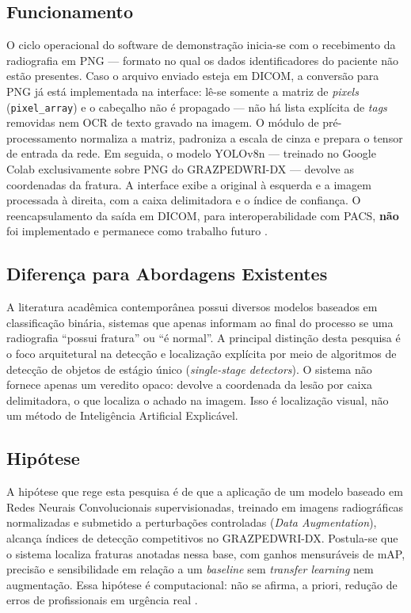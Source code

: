 \documentclass[12pt,oneside,a4paper,chapter=TITLE,section=TITLE,sumario=tradicional]{abntex2}
\begin{document}
\subsection{Funcionamento}
\label{subsec:funcionamento}
O ciclo operacional do software de demonstração inicia-se com o recebimento da radiografia em PNG --- formato no qual os dados identificadores do paciente não estão presentes. Caso o arquivo enviado esteja em DICOM, a conversão para PNG já está implementada na interface: lê-se somente a matriz de \textit{pixels} (\texttt{pixel\_array}) e o cabeçalho não é propagado --- não há lista explícita de \textit{tags} removidas nem OCR de texto gravado na imagem. O módulo de pré-processamento normaliza a matriz, padroniza a escala de cinza e prepara o tensor de entrada da rede. Em seguida, o modelo YOLOv8n \cite{jocher2023ultralytics} --- treinado no Google Colab exclusivamente sobre PNG do GRAZPEDWRI-DX --- devolve as coordenadas da fratura. A interface exibe a original à esquerda e a imagem processada à direita, com a caixa delimitadora e o índice de confiança. O reencapsulamento da saída em DICOM, para interoperabilidade com PACS, \textbf{não} foi implementado e permanece como trabalho futuro \cite{dicomstandard2024,nagy2022grazpedwri}.

\subsection{Diferença para Abordagens Existentes}
\label{subsec:diferenca_abordagens}
A literatura acadêmica contemporânea possui diversos modelos baseados em classificação binária, sistemas que apenas informam ao final do processo se uma radiografia ``possui fratura'' ou ``é normal''. A principal distinção desta pesquisa é o foco arquitetural na detecção e localização explícita por meio de algoritmos de detecção de objetos de estágio único (\textit{single-stage detectors}). O sistema não fornece apenas um veredito opaco: devolve a coordenada da lesão por caixa delimitadora, o que localiza o achado na imagem. Isso é localização visual, não um método de Inteligência Artificial Explicável.

\subsection{Hipótese}
\label{subsec:hipotese}
A hipótese que rege esta pesquisa é de que a aplicação de um modelo baseado em Redes Neurais Convolucionais supervisionadas, treinado em imagens radiográficas normalizadas e submetido a perturbações controladas (\textit{Data Augmentation}), alcança índices de detecção competitivos no GRAZPEDWRI-DX. Postula-se que o sistema localiza fraturas anotadas nessa base, com ganhos mensuráveis de mAP, precisão e sensibilidade em relação a um \textit{baseline} sem \textit{transfer learning} nem augmentação. Essa hipótese é computacional: não se afirma, a priori, redução de erros de profissionais em urgência real \cite{lin2014coco,kim2020,nagy2022grazpedwri}.
\end{document}
